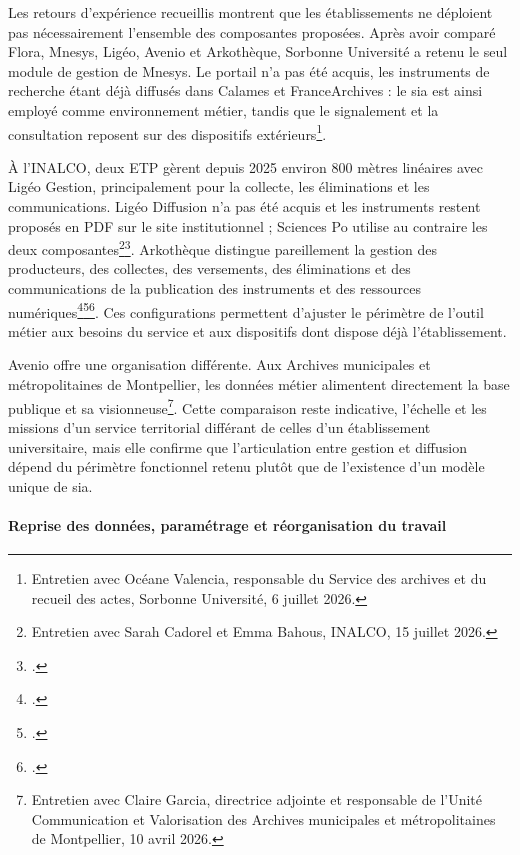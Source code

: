 Les retours d'expérience recueillis montrent que les établissements ne déploient pas nécessairement l'ensemble des composantes proposées. Après avoir comparé Flora, Mnesys, Ligéo, Avenio et Arkothèque, Sorbonne Université a retenu le seul module de gestion de Mnesys. Le portail n'a pas été acquis, les instruments de recherche étant déjà diffusés dans Calames et FranceArchives : le \gls{sia} est ainsi employé comme environnement métier, tandis que le \gls{signalement} et la consultation reposent sur des dispositifs extérieurs\footnote{Entretien avec Océane Valencia, responsable du Service des archives et du recueil des actes, Sorbonne Université, 6 juillet 2026.}.

À l'INALCO, deux ETP gèrent depuis 2025 environ 800 mètres linéaires avec Ligéo Gestion, principalement pour la collecte, les éliminations et les communications. Ligéo Diffusion n'a pas été acquis et les instruments restent proposés en PDF sur le site institutionnel ; Sciences Po utilise au contraire les deux composantes\footnote{Entretien avec Sarah Cadorel et Emma Bahous, INALCO, 15 juillet 2026.}\footcite{LigeoPresentation}. Arkothèque distingue pareillement la gestion des producteurs, des collectes, des versements, des éliminations et des communications de la publication des instruments et des ressources numériques\footcite{ArkothequeCollecte}\footcite{ArkothequeCommunication}\footcite{ArkothequePublication}. Ces configurations permettent d'ajuster le périmètre de l'outil métier aux besoins du service et aux dispositifs dont dispose déjà l'établissement.

Avenio offre une organisation différente. Aux Archives municipales et métropolitaines de Montpellier, les données métier alimentent directement la base publique et sa visionneuse\footnote{Entretien avec Claire Garcia, directrice adjointe et responsable de l'Unité Communication et Valorisation des Archives municipales et métropolitaines de Montpellier, 10 avril 2026.}. Cette comparaison reste indicative, l'échelle et les missions d'un service territorial différant de celles d'un établissement universitaire, mais elle confirme que l'articulation entre gestion et diffusion dépend du périmètre fonctionnel retenu plutôt que de l'existence d'un modèle unique de \gls{sia}.

\paragraph{Reprise des données, paramétrage et réorganisation du travail}

